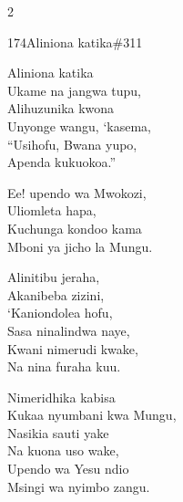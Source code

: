 \begin{multicols}{2}
\begin{hymn}{174}{Aliniona katika}{\#311}
\begin{stanza}
Aliniona katika\\
Ukame na jangwa tupu,\\
Alihuzunika kwona\\
Unyonge wangu, `kasema,\\
``Usihofu, Bwana yupo,\\
Apenda kukuokoa.''
\end{stanza}
\begin{chorus}
Ee! upendo wa Mwokozi,\\
Uliomleta hapa,\\
Kuchunga kondoo kama\\
Mboni ya jicho la Mungu.
\end{chorus}
\begin{stanza}
Alinitibu jeraha,\\
Akanibeba zizini,\\
`Kaniondolea hofu,\\
Sasa ninalindwa naye,\\
Kwani nimerudi kwake,\\
Na nina furaha kuu.
\end{stanza}
\begin{stanza}
Nimeridhika kabisa\\
Kukaa nyumbani kwa Mungu,\\
Nasikia sauti yake\\
Na kuona uso wake,\\
Upendo wa Yesu ndio\\
Msingi wa nyimbo zangu.
\end{stanza}
\end{hymn}


\end{multicols}

